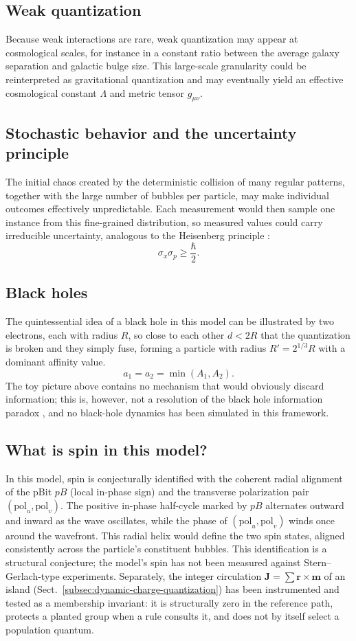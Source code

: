 \documentclass{ijuc}
\begin{document}
\subsection{Weak quantization}
Because weak interactions are rare, weak quantization may appear at cosmological scales, for instance in a constant ratio between the average galaxy separation and galactic bulge size. This large-scale granularity could be reinterpreted as gravitational quantization and may eventually yield an effective cosmological constant $\Lambda$ and metric tensor $g_{\mu\nu}$.
\subsection{Stochastic behavior and the uncertainty principle}
The initial chaos created by the deterministic collision of many regular patterns, together with the large number of bubbles per particle, may make individual outcomes effectively unpredictable. Each measurement would then sample one instance from this fine-grained distribution, so measured values could carry irreducible uncertainty, analogous to the Heisenberg principle \cite{Heisenberg1927}:
\[
\sigma_x \sigma_p \geq \frac{\hbar}{2}.
\]
\subsection{Black holes}
The quintessential idea of a black hole in this model can be illustrated by two electrons, each with radius $R$, so close to each other $d<2R$ that the quantization is broken and they simply fuse, forming a particle with radius $R'=2^{1/3}R$ with a dominant affinity value.
\[
a_1 = a_2 = \min(A_1,A_2).
\]
The toy picture above contains no mechanism that would obviously discard information; this is, however, not a resolution of the black hole information paradox \cite{hawking1976breakdown,harlow2016jerusalem}, and no black-hole dynamics has been simulated in this framework.
\subsection{What is spin in this model?}
In this model, spin is conjecturally identified with the coherent radial alignment of the pBit $pB$ (local in-phase sign) and the transverse polarization pair $(\mathrm{pol}_u,\mathrm{pol}_v)$. The positive in-phase half-cycle marked by $pB$ alternates outward and inward as the wave oscillates, while the phase of $(\mathrm{pol}_u,\mathrm{pol}_v)$ winds once around the wavefront. This radial helix would define the two spin states, aligned consistently across the particle's constituent bubbles. This identification is a structural conjecture; the model's spin has not been measured against Stern--Gerlach-type experiments. Separately, the integer circulation $\mathbf{J}=\sum\mathbf{r}\times\mathbf{m}$ of an island (Sect.~\ref{subsec:dynamic-charge-quantization}) has been instrumented and tested as a membership invariant: it is structurally zero in the reference path, protects a planted group when a rule consults it, and does not by itself select a population quantum.
\end{document}
